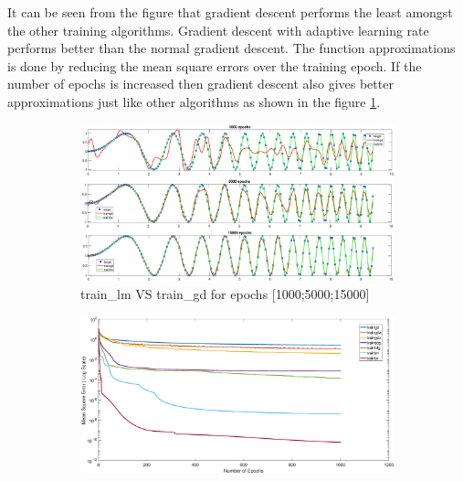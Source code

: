 It can be seen from the figure that gradient descent performs the least amongst the other training algorithms. Gradient descent with adaptive learning rate performs better than the normal gradient descent. The function approximations is done by reducing the mean square errors over the training epoch. If the number of epochs is increased then gradient descent also gives better approximations just like other algorithms as shown in the figure \ref{fig:train_lm_gd_2}.
\begin{figure}
	\begin{subfigure}[b]{0.33\textwidth}
 		\centering
 		\captionsetup{width=1\linewidth, format = hang}
 		\includegraphics[height = 0.7\textwidth,width = 1\textwidth]{Exercise1/Report/train_lm_gd_2}
	 	\caption{train\_lm VS  train\_gd for epochs [1000;5000;15000]}\label{fig:train_lm_gd_2}
	 \end{subfigure}%
	 \begin{subfigure}[b]{0.33\textwidth}
 		\centering
 		\captionsetup{width=0.8\linewidth, format = hang}
 		\includegraphics[height = 0.7\textwidth,width = 1\textwidth]{Exercise1/Report/mse_1}

\end{subfigure}
\end{figure}
